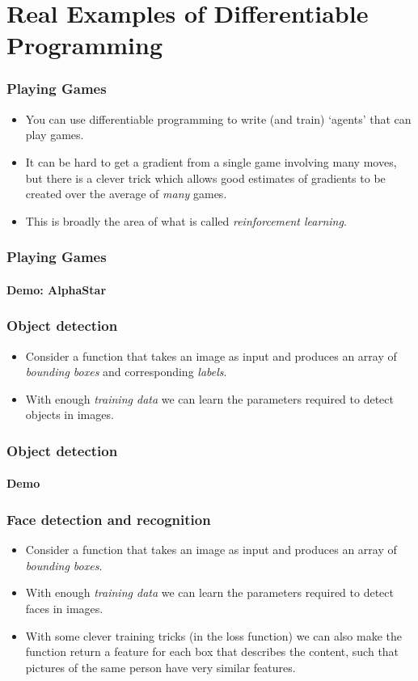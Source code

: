 \documentclass[\beamerclass]{beamer}
\begin{document}
\section{Real Examples of Differentiable Programming}

\begin{frame}
\frametitle{Playing Games}

\begin{itemize}
	\item You can use differentiable programming to write (and train) `agents' that can play games.
	\item It can be hard to get a gradient from a single game involving many moves, but there is a clever trick which allows good estimates of gradients to be created over the average of \emph{many} games.
	\item This is broadly the area of what is called \emph{reinforcement learning}.
\end{itemize}

\end{frame}

\begin{frame}
\frametitle{Playing Games}
\framesubtitle{Demo: AlphaStar}
\end{frame}

\begin{frame}
\frametitle{Object detection}

\begin{itemize}
	\item Consider a function that takes an image as input and produces an array of \emph{bounding boxes} and corresponding \emph{labels}.
	\item With enough \emph{training data} we can learn the parameters required to detect objects in images.
\end{itemize}

\end{frame}

\begin{frame}
\frametitle{Object detection}
\framesubtitle{Demo}

\end{frame}

\begin{frame}
\frametitle{Face detection and recognition}

\begin{itemize}
	\item Consider a function that takes an image as input and produces an array of \emph{bounding boxes}.
	\item With enough \emph{training data} we can learn the parameters required to detect faces in images.
	\item With some clever training tricks (in the loss function) we can also make the function return a feature for each box that describes the content, such that pictures of the same person have very similar features.
\end{itemize}

\end{frame}
\end{document}
